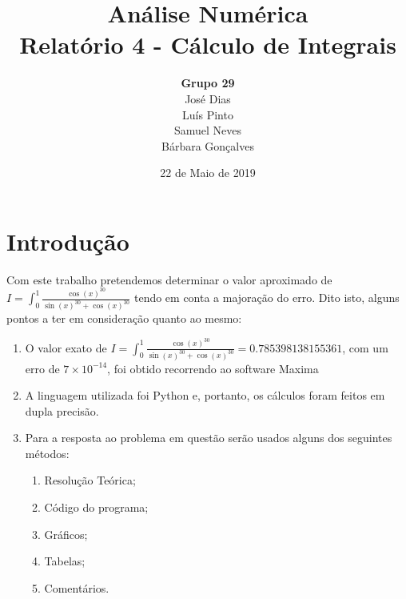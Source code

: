 \documentclass{article}
\title{\textbf{Análise Numérica\\Relatório 4 - Cálculo de Integrais}}
\author{\textbf{Grupo 29}\\[4mm]José Dias\\Luís Pinto\\Samuel Neves\\Bárbara Gonçalves\\}
\date{22 de Maio de 2019}
\begin{document}
\maketitle
\clearpage
\pagestyle{fancy}
\fancyhf{}
\setlength{\headheight}{30pt}
\setlength{\footskip}{15pt}
\rfoot{\thepage}
\section{Introdução}
\hspace{6mm}Com este trabalho pretendemos determinar o valor aproximado de $ I = \int_{0}^{1}\frac{\cos(x)^{30}}{\sin(x)^{30}+\cos(x)^{30}} $ tendo em conta a majoração do erro. Dito isto, alguns pontos a ter em consideração quanto ao mesmo:
\begin{enumerate}
  \item{O valor exato de  $ I = \int_{0}^{1}\frac{\cos(x)^{30}}{\sin(x)^{30}+\cos(x)^{30}} = 0.785398138155361 $, com um erro de $7\times10^{-14}$, foi obtido recorrendo ao  software Maxima}
  \item{A linguagem utilizada foi Python e, portanto, os cálculos foram feitos em dupla precisão.}
  \item{Para a resposta ao problema em questão serão usados alguns dos seguintes métodos:}
  \begin{enumerate}
    \item[\textbullet]{Resolução Teórica;}
    \item[\textbullet]{Código do programa;}
    \item[\textbullet]{Gráficos;}
    \item[\textbullet]{Tabelas;}
    \item[\textbullet]{Comentários.}

  \end{enumerate}
\end{enumerate}
\end{document}
